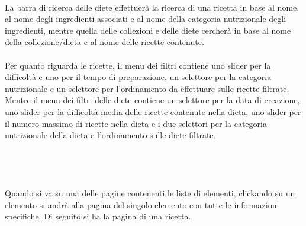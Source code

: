 ﻿\documentclass[a4paper,12pt]{report}
\begin{document}
\\La barra di ricerca delle diete effettuerà la ricerca di una ricetta in base al nome, al nome degli ingredienti associati e al nome della categoria nutrizionale degli ingredienti, mentre quella delle collezioni e delle diete cercherà in base al nome della collezione/dieta e al nome delle ricette contenute.
\\\\Per quanto riguarda le ricette, il menu dei filtri contiene uno slider per la difficoltà e uno per il tempo di preparazione, un selettore per la categoria nutrizionale e un selettore per l'ordinamento da effettuare sulle ricette filtrate.
Mentre il menu dei filtri delle diete contiene un selettore per la data di creazione, uno slider per la difficoltà media delle ricette contenute nella dieta, uno slider per il numero massimo di ricette nella dieta e i due selettori per la categoria nutrizionale della dieta e l'ordinamento sulle diete filtrate.
\\\\\\\\\\Quando si va su una delle pagine contenenti le liste di elementi, clickando su un elemento si andrà alla pagina del singolo elemento con tutte le informazioni specifiche. 
Di seguito si ha la pagina di una ricetta.
\end{document}
